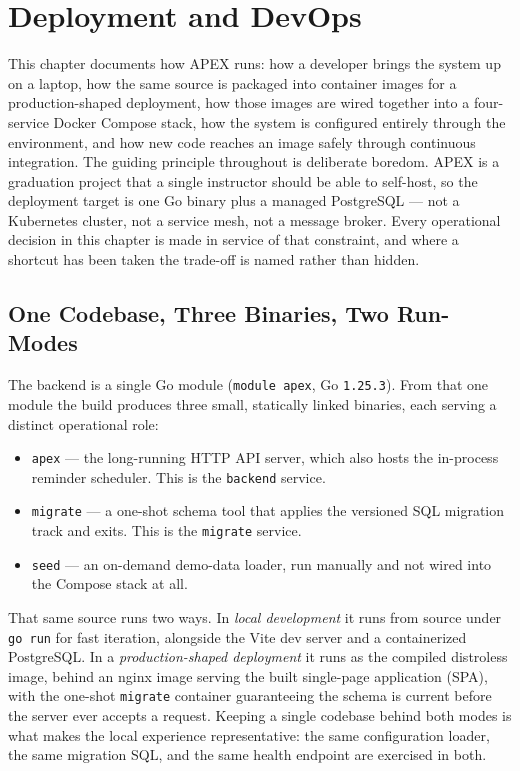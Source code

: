 \chapter{Deployment and DevOps}\label{ch:ch10}

This chapter documents how APEX runs: how a developer brings the system up on a laptop, how the same source is packaged into container images for a production-shaped deployment, how those images are wired together into a four-service Docker Compose stack, how the system is configured entirely through the environment, and how new code reaches an image safely through continuous integration. The guiding principle throughout is deliberate boredom. APEX is a graduation project that a single instructor should be able to self-host, so the deployment target is one Go binary plus a managed PostgreSQL --- not a Kubernetes cluster, not a service mesh, not a message broker. Every operational decision in this chapter is made in service of that constraint, and where a shortcut has been taken the trade-off is named rather than hidden.

\section{One Codebase, Three Binaries, Two Run-Modes}

The backend is a single Go module (\texttt{module apex}, Go \texttt{1.25.3}). From that one module the build produces three small, statically linked binaries, each serving a distinct operational role:

\begin{itemize}
  \item \texttt{apex} --- the long-running HTTP API server, which also hosts the in-process reminder scheduler. This is the \texttt{backend} service.
  \item \texttt{migrate} --- a one-shot schema tool that applies the versioned SQL migration track and exits. This is the \texttt{migrate} service.
  \item \texttt{seed} --- an on-demand demo-data loader, run manually and not wired into the Compose stack at all.
\end{itemize}

That same source runs two ways. In \emph{local development} it runs from source under \texttt{go run} for fast iteration, alongside the Vite dev server and a containerized PostgreSQL. In a \emph{production-shaped deployment} it runs as the compiled distroless image, behind an nginx image serving the built single-page application (SPA), with the one-shot \texttt{migrate} container guaranteeing the schema is current before the server ever accepts a request. Keeping a single codebase behind both modes is what makes the local experience representative: the same configuration loader, the same migration SQL, and the same health endpoint are exercised in both.

